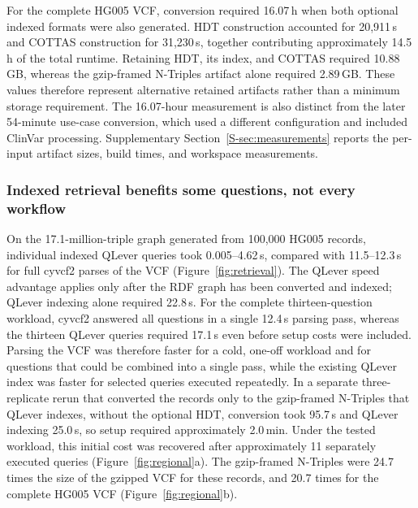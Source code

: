 \documentclass[pdflatex,sn-mathphys-num]{sn-jnl}
\begin{document}
For the complete HG005 VCF, conversion required 16.07\,h when both optional indexed formats were also generated.
HDT construction accounted for 20,911\,s and COTTAS construction for 31,230\,s, together contributing approximately 14.5\,h of the total runtime.
Retaining HDT, its index, and COTTAS required 10.88\,GB, whereas the gzip-framed N-Triples artifact alone required 2.89\,GB.
These values therefore represent alternative retained artifacts rather than a minimum storage requirement.
The 16.07-hour measurement is also distinct from the later 54-minute use-case conversion, which used a different configuration and included ClinVar processing.
Supplementary Section~\ref{S-sec:measurements} reports the per-input artifact sizes, build times, and workspace measurements.

\subsubsection{Indexed retrieval benefits some questions, not every workflow}\label{subsubsec:results-retrieval}
On the 17.1-million-triple graph generated from 100,000 HG005 records, individual indexed QLever queries took 0.005--4.62\,s, compared with 11.5--12.3\,s for full cyvcf2 parses of the VCF (Figure~\ref{fig:retrieval}).
The QLever speed advantage applies only after the RDF graph has been converted and indexed; QLever indexing alone required 22.8\,s.
For the complete thirteen-question workload, cyvcf2 answered all questions in a single 12.4\,s parsing pass, whereas the thirteen QLever queries required 17.1\,s even before setup costs were included.
Parsing the VCF was therefore faster for a cold, one-off workload and for questions that could be combined into a single pass, while the existing QLever index was faster for selected queries executed repeatedly.
In a separate three-replicate rerun that converted the records only to the gzip-framed N-Triples that QLever indexes, without the optional HDT, conversion took 95.7\,s and QLever indexing 25.0\,s, so setup required approximately 2.0\,min.
Under the tested workload, this initial cost was recovered after approximately 11 separately executed queries (Figure~\ref{fig:regional}a).
The gzip-framed N-Triples were 24.7 times the size of the gzipped VCF for these records, and 20.7 times for the complete HG005 VCF (Figure~\ref{fig:regional}b).
\end{document}
